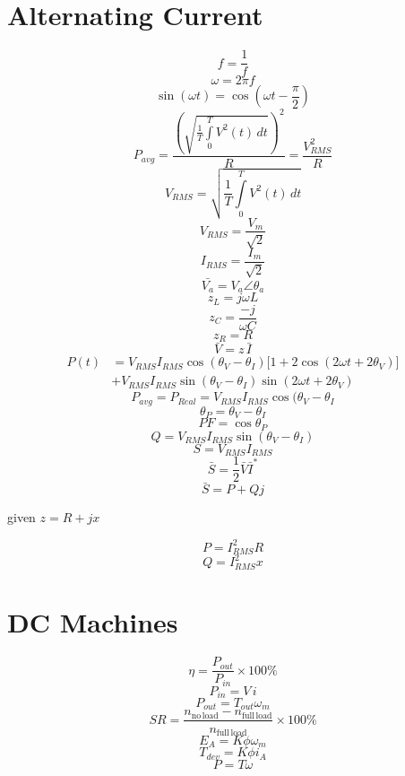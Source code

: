 \documentclass[14pt]{article}
\begin{document}
    \section{Alternating Current}
    \begin{multicols}{2}
        $$f=\frac{1}{f}$$
        $$\omega=2\pi f$$
        $$\sin(\omega t)=\cos\left(\omega t-\frac{\pi}{2}\right)$$
        $$P_{avg}=\frac{\left(\sqrt{\frac{1}{T}\int\limits_0^TV^2(t)\, dt}\right)^2}{R}=\frac{V_{RMS}^2}{R}$$
        $$V_{RMS}=\sqrt{\frac{1}{T}\int\limits_0^TV^2(t)\, dt}$$
        $$V_{RMS}=\frac{V_m}{\sqrt{2}}$$
        $$I_{RMS}=\frac{I_m}{\sqrt{2}}$$
        $$\bar {V_a}=V_a\angle\theta_a$$
        $$z_L=j\omega L$$
        $$z_C=\frac{-j}{\omega C}$$
        $$z_R=R$$
        $$\bar {V}=z\, \bar{I}$$
        \begin{align*}
            P(t)&=V_{RMS}I_{RMS}\cos(\theta_V-\theta_I)\big[1+2\cos(2\omega t+2\theta_V)\big]\\&+V_{RMS}I_{RMS}\sin(\theta_V-\theta_I)\sin(2\omega t+2\theta_V)
        \end{align*}
        $$P_{avg}=P_{Real}=V_{RMS}I_{RMS}\cos(\theta_V-\theta_I$$
        $$\theta_P=\theta_V-\theta_I$$
        $$PF=\cos \theta_P$$
        $$Q=V_{RMS}I_{RMS}\sin(\theta_V-\theta_I)$$
        $$S=V_{RMS}I_{RMS}$$
        $$\bar S=\frac{1}{2}\bar V\bar I^*$$
        $$\bar S=P+Qj$$
        \begin{center}
            given $z=R+jx$ 
        \end{center}
        $$P=I_{RMS}^2R$$
        $$Q=I_{RMS}^2x$$
    \end{multicols}
    \section{DC Machines}
    \begin{multicols}{2}
        $$\eta=\frac{P_{out}}{P_{in}}\times100\%$$
        $$P_{in}=V\, i$$
        $$P_{out}=T_{out}\omega_m$$
        $$SR=\frac{n_{\mathrm{no\, load}}-n_{\mathrm{full\, load}}}{n_{\mathrm{full\,load}}}\times100\%$$
        $$\boxed{E_A=K\phi\omega_m}$$
        $$\boxed{T_{dev}=K\phi i_A}$$
        $$\boxed{P=T\omega}$$
    \end{multicols}
\end{document}
